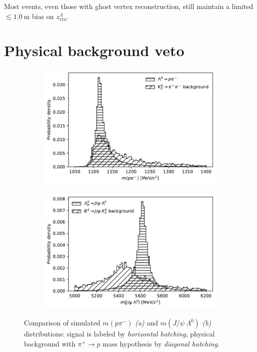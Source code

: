 Most \demonstratorshort events, even those with ghost vertex reconstruction, still maintain a limited $\lesssim \SI{1.0}{\meter}$ bias on $z_\text{vtx}^\Lambda$.


\section{Physical background veto}
\label{sec:B0_veto}
\begin{figure}[t]
	\centering
	\begin{subfigure}{.45\textwidth}
		\includegraphics[width=\textwidth]{graphics/04-event_selection/phys_bkg_lambda_comparison.pdf}
		\caption{}
	\end{subfigure}
	\begin{subfigure}{.45\textwidth}
		\includegraphics[width=\textwidth]{graphics/04-event_selection/phys_bkg_lambdab_comparison.pdf}
		\caption{}
	\end{subfigure}
	\caption{Comparison of simulated $m(p\pi^-)$ \textit{(a)} and $m(J/\psi~\Lambda^0)$ \textit{(b)} distributions: \demonstratorshort signal is labeled by \textit{horizontal hatching}, \physbkgshort physical background with $\pi^+ \rightarrow p$ mass hypothesis by \textit{diagonal hatching}.}
\end{figure}


